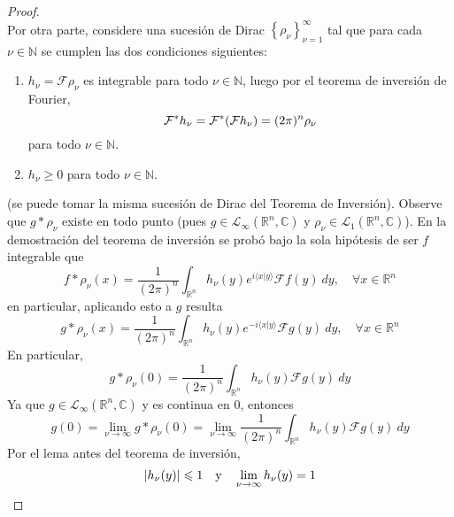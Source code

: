 \documentclass[12pt]{report}
\theoremstyle{largebreak}
\renewcommand{\leq}{\ensuremath{\leqslant}}
\renewcommand{\geq}{\ensuremath{\geqslant}}
\newcommand\abs[1]{\ensuremath{\left|#1\right|}}
\newcommand\pint[2]{\ensuremath{\langle#1| #2\rangle}}
\newcommand{\fou}[1]{\ensuremath{\mathcal{F}#1}}
\begin{document}
\begin{proof}
\begin{equation*}
        \end{equation*}
        Por otra parte, considere una sucesión de Dirac $\left\{\rho_\nu\right\}_{\nu=1}^\infty$ tal que para cada $\nu\in\mathbb{N}$ se cumplen las dos condiciones siguientes:
        \begin{enumerate}
            \item $h_\nu=\fou{\rho_\nu}$ es integrable para todo $\nu\in\mathbb{N}$, luego por el teorema de inversión de Fourier,
            \begin{equation*}
                \fou^*{h_\nu}=\fou^*{(\fou{h_\nu})}=(2\pi)^n\rho_\nu
            \end{equation*}
            para todo $\nu\in\mathbb{N}$.
            \item $h_\nu\geq0$ para todo $\nu\in\mathbb{N}$.
        \end{enumerate}
        (se puede tomar la misma sucesión de Dirac del Teorema de Inversión). Observe que $g*\rho_\nu$ existe en todo punto (pues $g\in\mathcal{L}_{\infty}(\mathbb{R}^n,\mathbb{C})$ y $\rho_\nu\in\mathcal{L}_{1}(\mathbb{R}^n,\mathbb{C})$). En la demostración del teorema de inversión se probó bajo la sola hipótesis de ser $f$ integrable que
        \begin{equation*}
            f*\rho_\nu(x)=\frac{1}{(2\pi)^n}\int_{\mathbb{R}^n}h_\nu(y)e^{ i\pint{x}{y}}\fou{f}(y)\:dy,\quad\forall x\in\mathbb{R}^n
        \end{equation*}
        en particular, aplicando esto a $g$ resulta
        \begin{equation*}
            g*\rho_\nu(x)=\frac{1}{(2\pi)^n}\int_{\mathbb{R}^n}h_\nu(y)e^{ -i\pint{x}{y}}\fou{g}(y)\:dy,\quad\forall x\in\mathbb{R}^n
        \end{equation*}
        En particular,
        \begin{equation*}
            g*\rho_\nu(0)=\frac{1}{(2\pi)^n}\int_{\mathbb{R}^n}h_\nu(y)\fou{g}(y)\:dy
        \end{equation*}
        Ya que $g\in\mathcal{L}_{\infty}(\mathbb{R}^n,\mathbb{C})$ y es continua en 0, entonces
        \begin{equation*}
            g(0)=\lim_{\nu\rightarrow\infty}g*\rho_\nu(0)=\lim_{\nu\rightarrow\infty}\frac{1}{(2\pi)^n}\int_{\mathbb{R}^n}h_\nu(y)\fou{g}(y)\:dy
        \end{equation*}
        Por el lema antes del teorema de inversión,
        \begin{equation*}
            \abs{h_\nu(y)}\leq 1\quad\textup{y}\quad\lim_{\nu\rightarrow\infty}h_\nu(y)=1

\end{equation*}
\end{proof}
\end{document}
